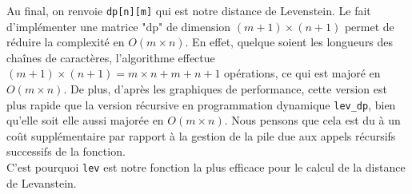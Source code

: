 \documentclass[12pt]{article}
\begin{document}
Au final, on renvoie \texttt{dp[n][m]} qui est notre distance de Levenstein. Le fait d'implémenter une matrice "dp" de dimension $(m+1)\times (n+1)$ permet de réduire la complexité en $O(m\times n)$. En effet, quelque soient les longueurs des chaînes de caractères, l'algorithme effectue $(m+1)\times (n+1) = m\times n + m + n +1$ opérations, ce qui est majoré en $O(m\times n)$.
De plus, d'après les graphiques de performance, cette version est plus rapide que la version récursive en programmation dynamique \texttt{lev\_dp}, bien qu'elle soit elle aussi majorée en $O(m\times n)$. Nous pensons que cela est du à un coût supplémentaire par rapport à la gestion de la pile due aux appels récursifs successifs de la fonction.\\
C'est pourquoi \texttt{lev} est notre fonction la plus efficace pour le calcul de la distance de Levanstein.
\end{document}
